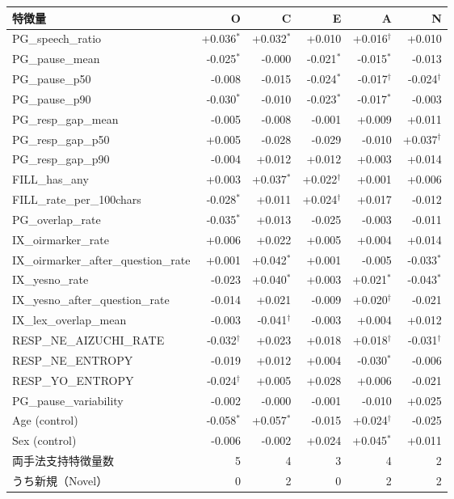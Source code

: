 \begingroup
\footnotesize
\setlength{\tabcolsep}{4pt}
\begin{tabular}{lrrrrr}
\toprule
特徴量 & O & C & E & A & N \\
\midrule
PG\_speech\_ratio & +0.036$^{*}$ & +0.032$^{*}$ & +0.010 & +0.016$^{\dagger}$ & +0.010 \\
PG\_pause\_mean & -0.025$^{*}$ & -0.000 & -0.021$^{*}$ & -0.015$^{*}$ & -0.013 \\
PG\_pause\_p50 & -0.008 & -0.015 & -0.024$^{*}$ & -0.017$^{\dagger}$ & -0.024$^{\dagger}$ \\
PG\_pause\_p90 & -0.030$^{*}$ & -0.010 & -0.023$^{*}$ & -0.017$^{*}$ & -0.003 \\
PG\_resp\_gap\_mean & -0.005 & -0.008 & -0.001 & +0.009 & +0.011 \\
PG\_resp\_gap\_p50 & +0.005 & -0.028 & -0.029 & -0.010 & +0.037$^{\dagger}$ \\
PG\_resp\_gap\_p90 & -0.004 & +0.012 & +0.012 & +0.003 & +0.014 \\
FILL\_has\_any & +0.003 & +0.037$^{*}$ & +0.022$^{\dagger}$ & +0.001 & +0.006 \\
FILL\_rate\_per\_100chars & -0.028$^{*}$ & +0.011 & +0.024$^{\dagger}$ & +0.017 & -0.012 \\
PG\_overlap\_rate & -0.035$^{*}$ & +0.013 & -0.025 & -0.003 & -0.011 \\
IX\_oirmarker\_rate & +0.006 & +0.022 & +0.005 & +0.004 & +0.014 \\
IX\_oirmarker\_after\_question\_rate & +0.001 & +0.042$^{*}$ & +0.001 & -0.005 & -0.033$^{*}$ \\
IX\_yesno\_rate & -0.023 & +0.040$^{*}$ & +0.003 & +0.021$^{*}$ & -0.043$^{*}$ \\
IX\_yesno\_after\_question\_rate & -0.014 & +0.021 & -0.009 & +0.020$^{\dagger}$ & -0.021 \\
IX\_lex\_overlap\_mean & -0.003 & -0.041$^{\dagger}$ & -0.003 & +0.004 & +0.012 \\
RESP\_NE\_AIZUCHI\_RATE & -0.032$^{\dagger}$ & +0.023 & +0.018 & +0.018$^{\dagger}$ & -0.031$^{\dagger}$ \\
RESP\_NE\_ENTROPY & -0.019 & +0.012 & +0.004 & -0.030$^{*}$ & -0.006 \\
RESP\_YO\_ENTROPY & -0.024$^{\dagger}$ & +0.005 & +0.028 & +0.006 & -0.021 \\
PG\_pause\_variability & -0.002 & -0.000 & -0.001 & -0.010 & +0.025 \\
\midrule
Age (control) & -0.058$^{*}$ & +0.057$^{*}$ & -0.015 & +0.024$^{\dagger}$ & -0.025 \\
Sex (control) & -0.006 & -0.002 & +0.024 & +0.045$^{*}$ & +0.011 \\
\midrule
両手法支持特徴量数 & 5 & 4 & 3 & 4 & 2 \\
\quad うち新規（Novel） & 0 & 2 & 0 & 2 & 2 \\
\bottomrule
\end{tabular}
\endgroup
